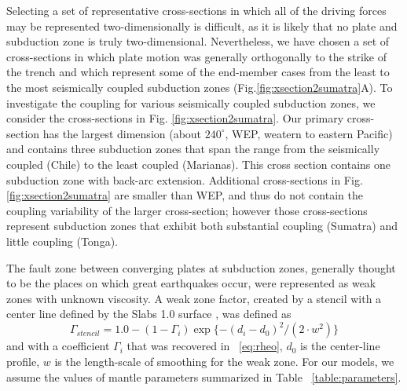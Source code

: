 \documentclass[12pt]{article}
\begin{document}
{Selecting a set of representative cross-sections in which all of the driving forces may be represented two-dimensionally is difficult, as it is likely that no plate and subduction zone is truly two-dimensional. 
Nevertheless, we have chosen a set of cross-sections in which plate motion was generally orthogonally to the strike of the trench and which represent some of the end-member cases from the least to the most seismically coupled subduction zones (Fig.\ref{fig:xsection2sumatra}A). To investigate the coupling for various seismically coupled subduction zones, we consider the cross-sections in Fig. \ref{fig:xsection2sumatra}. 
Our primary cross-section has the largest dimension (about $240^{\circ}$, WEP, weatern to eastern Pacific) and contains three subduction zones that span the range from the seismically coupled (Chile) to the least coupled (Marianas). This cross section contains one subduction zone with back-arc extension. Additional cross-sections in Fig.\ref{fig:xsection2sumatra} are smaller than WEP, and thus do not contain the coupling variability of the larger cross-section; however those cross-sections represent subduction zones that exhibit both substantial coupling (Sumatra) and little coupling (Tonga).




The fault zone between converging plates at subduction zones, generally thought to be the places on which great earthquakes occur, were represented as weak zones with unknown viscosity. 
A weak zone factor, created by a stencil with a center line defined by the Slabs 1.0 surface \citep{Hayes2012}, was defined as
\begin{equation}
\Gamma_{stencil} = 1.0 - (1-\Gamma_i)\exp\{-(d_i-d_0)^2/(2\cdot w^2)\}
\end{equation}
and with a coefficient $\Gamma_i$ that was recovered in ~\eqref{eq:rheo}, $d_0$ is the center-line profile, $w$ is the length-scale of smoothing for the weak zone.
 For our models, we assume the values of mantle parameters summarized in Table ~\ref{table:parameters}.

}
\end{document}
